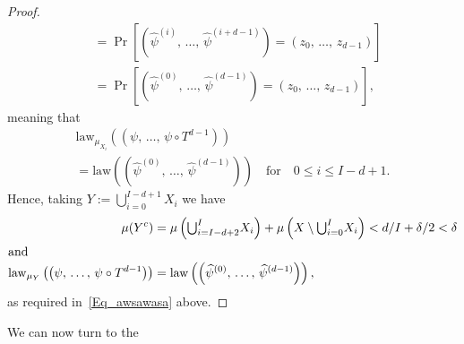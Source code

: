 \documentclass[10pt]{amsart}
\theoremstyle{definition}\newtheorem{defi}[theo]{Definition}\newtheorem{rema}[theo]{Remark}\newtheorem{exam}[theo]{Example}\newtheorem{exem}[theo]{Example}\newtheorem{nota}[theo]{Notation}
\newcommand{\law}{\mathrm{law}}
\begin{document}
\begin{proof}
\begin{align*}
& =\Pr\left[\left(\widehat{\psi}^{(i)},\,\ldots,\,\widehat{\psi}^{(i+d-1)}\right)=\left(z_{0},\,\ldots,\,z_{d-1}\right)\right]\\
& =\Pr\left[\left(\widehat{\psi}^{(0)},\,\ldots,\,\widehat{\psi}^{(d-1)}\right)=\left(z_{0},\,\ldots,\,z_{d-1}\right)\right]\text{,}
\end{align*}
meaning that
\begin{multline}
\law_{\mu_{X_{i}}}\left(\left(\psi,\,\ldots,\,\psi\circ T^{d-1}\right)\right)\\
=\law \left(\left(\widehat{\psi}^{(0)},\,\ldots,\,\widehat{\psi}^{(d-1)}\right)\right)\quad\text{for}\quad 0\leq i\leq I-d+1.
\end{multline}
Hence, taking $Y:= {\textstyle\bigcup\nolimits_{i=0}^{I-d+1}} X_{i}$ we have 
\begin{align*}
\mu(Y^{c}) &=\mu\left({\textstyle\bigcup\nolimits_{i=I-d+2}^{I}} X_{i}\right)+\mu\left(X\setminus {\textstyle\bigcup\nolimits_{i=0}^{I}} X_{i}\right)<d/I+\delta/2<\delta
\\
\intertext{and} 
\law_{\mu_{Y}}\left(\left(\psi,\,\ldots,\,\psi\circ T^{d-1}\right)\right) &=\law\left(\left(\widehat{\psi}^{(0)},\,\ldots,\,\widehat{\psi}^{(d-1)}\right)\right),
\end{align*}
as required in~\eqref{Eq_awsawasa} above.
\end{proof}


We can now turn to the
\end{document}
